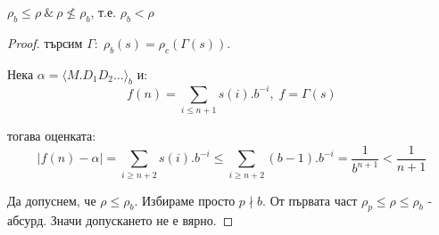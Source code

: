 \begin{corollary}
    $\rho_b \leq \rho\ \&\ \rho \nleq \rho_b$, т.е. $\rho_b < \rho$
\end{corollary}
\begin{proof}
    търсим $\Gamma:\; \rho_b(s) = \rho_c(\Gamma(s))$. 
    
    Нека $\alpha = \langle M.D_1 D_2 \dots \rangle_b$ и:
    \begin{equation}
        f(n) = \sum\limits_{i \leq n+1} s(i).b^{-i},\; f = \Gamma(s)
    \end{equation}

    тогава оценката:
    \begin{equation}
        |f(n) - \alpha| = \sum\limits_{i \geq n+2} s(i).b^{-i} \leq \sum\limits_{i \geq n+2} (b-1).b^{-i} = \frac{1}{b^{n+1}} < \frac{1}{n+1}
    \end{equation}
    
    Да допуснем, че $\rho \leq \rho_b$. Избираме просто $p \nmid b$. От първата част $\rho_p \leq \rho \leq \rho_b$ - абсурд. Значи допускането не е вярно.
\end{proof}